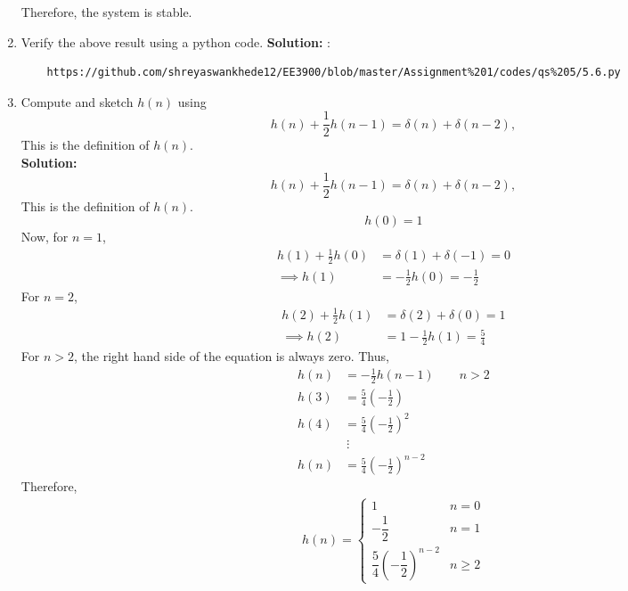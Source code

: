 \documentclass[journal,12pt,twocolumn]{IEEEtran}
\newcommand{\solution}{\noindent \textbf{Solution: }}
\providecommand{\brak}[1]{\ensuremath{\left(#1\right)}}
\numberwithin{equation}{section}
\renewcommand\thesection{\arabic{section}}
\renewcommand\thesection{\arabic{section}}
\begin{document}
\begin{enumerate}[label=\thesection.\arabic*]
	Therefore, the system is stable.
\item Verify the above result using a python code.
\solution :\\
\begin{lstlisting}
	https://github.com/shreyaswankhede12/EE3900/blob/master/Assignment%201/codes/qs%205/5.6.py
\end{lstlisting}
\item 
Compute and sketch $h(n)$ using 
\begin{equation}
\label{eq:iir_filter_h}
h(n) + \frac{1}{2}h(n-1) = \delta(n) + \delta(n-2), 
\end{equation}
%
This is the definition of $h(n)$.
\\
\solution \begin{equation}
	\label{eq:iir_filter_h}
	h(n) + \frac{1}{2}h(n-1) = \delta(n) + \delta(n-2), 
	\end{equation}
	This is the definition of $h(n)$.
	\\
	\begin{equation}
		 h(0) = 1
	\end{equation}
	Now, for $n = 1$,
	\begin{align}
		 h(1) + \frac12 h(0) &= \delta(1) + \delta(-1) = 0 \\
		 \implies h(1) &= - \frac{1}{2} h(0) = -\frac{1}{2}
	\end{align}
	For $n = 2$,
	\begin{align}
		 h(2) + \frac12 h(1) &= \delta(2) + \delta(0) = 1 \\
		 \implies h(2) &= 1 - \frac{1}{2} h(1) = \frac{5}{4}
	\end{align}
	For $n > 2$, the right hand side of the equation is always zero. Thus,
	\begin{align}
		 h(n) &= -\frac{1}{2} h(n-1) \qquad n > 2 \\
		 h(3) &= \frac{5}{4} \brak{-\frac12} \\
		 h(4) &= \frac{5}{4} \brak{-\frac12}^2 \\
		 &~\vdots \\
		 h(n) &= \frac{5}{4} \brak{-\frac12}^{n-2}
	\end{align}
	Therefore,
	\begin{align}
		 h(n) = 
		 \begin{cases}
			  1 & n = 0 \\
			  -\dfrac{1}{2} & n = 1 \\
			  \dfrac{5}{4} \brak{-\dfrac12}^{n-2} & n \ge 2
		 \end{cases}
	\end{align}

\end{enumerate}
\end{document}
